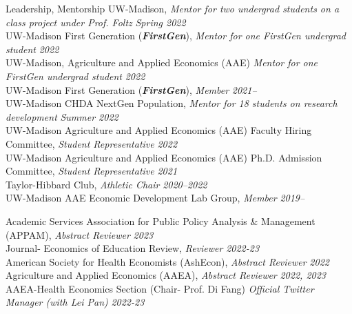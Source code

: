\documentclass{resume} %
\begin{document}
\begin{rSection}{Leadership, Mentorship}%
UW-Madison, \textit{Mentor for two undergrad students on a class project under Prof. Foltz} {\hfill\textit{Spring 2022}}\\ 
UW-Madison First Generation (\textbf{\textit{FirstGen}}), \textit{Mentor for one FirstGen undergrad student} {\hfill\textit{2022}}\\
UW-Madison, Agriculture and Applied Economics (AAE) \textit{Mentor for one FirstGen undergrad student} {\hfill\textit{2022}}\\
UW-Madison First Generation (\textbf{\textit{FirstGen}}), \textit{Member} {\hfill\textit{ 2021--}}\\
UW-Madison CHDA NextGen Population, \textit{Mentor for 18 students on research development} {\hfill\textit{ Summer 2022}}\\
UW-Madison Agriculture and Applied Economics (AAE) Faculty Hiring Committee, \textit{Student Representative} {\hfill \textit{2022}}\\
UW-Madison Agriculture and Applied Economics (AAE) Ph.D. Admission Committee, \textit{Student Representative} {\hfill \textit{2021}}\\
Taylor-Hibbard Club, \textit{Athletic Chair} {\hfill \textit{2020--2022}} \\
UW-Madison AAE Economic Development Lab Group, \textit{Member} {\hfill \textit{2019--}}
\end{rSection}



\begin{rSection}{Academic Services}%
Association for Public Policy Analysis \& Management (APPAM),  \textit{Abstract Reviewer}  {\hfill \em 2023} \\
Journal- Economics of Education Review, \textit{Reviewer} {\hfill\textit{2022-23}} \\ 
American Society for Health Economists (AshEcon), \textit{Abstract Reviewer} {\hfill\textit{2022}} \\ 
Agriculture and Applied Economics (AAEA), \textit{Abstract Reviewer} {\hfill \textit{2022, 2023}}\\
AAEA-Health Economics Section (Chair- Prof. Di Fang) \textit{Official Twitter Manager (with Lei Pan)} {\hfill \textit{2022-23}}  
\end{rSection}
\end{document}
